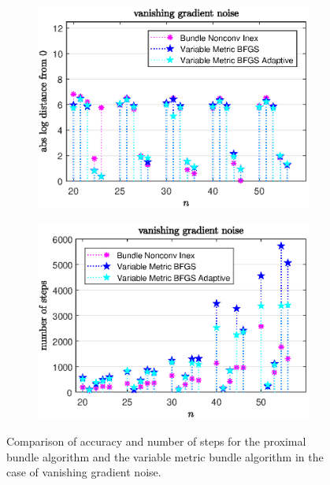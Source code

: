 \vspace{-1.5em}

\begin{figure}[H]
	\begin{subfigure}{0.49\textwidth}
		\includegraphics[width=\textwidth]{Pictures/Plots/vanishing_gradient_noise_b.eps}%
	\end{subfigure}%
	\hfill
	\begin{subfigure}{0.49\textwidth}
		\includegraphics[width=\textwidth]{Pictures/Plots/steps_vanishing_gradient_noise_b.eps}%
	\end{subfigure}
	\caption[Accuracy and number of steps: vanishing gradient noise, higher dimensions]{Comparison of accuracy and number of steps for the proximal bundle algorithm and the variable metric bundle algorithm in the case of vanishing gradient noise.}%
	\label{fig_van_grad_noise_large}%
\end{figure}

